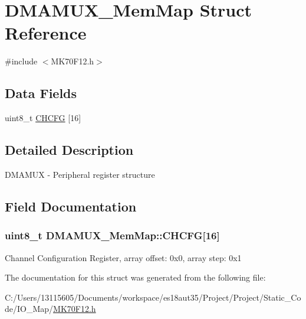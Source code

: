 \hypertarget{struct_d_m_a_m_u_x___mem_map}{}\section{D\+M\+A\+M\+U\+X\+\_\+\+Mem\+Map Struct Reference}
\label{struct_d_m_a_m_u_x___mem_map}


{\ttfamily \#include $<$M\+K70\+F12.\+h$>$}

\subsection*{Data Fields}
\begin{DoxyCompactItemize}
\item 
uint8\+\_\+t \hyperlink{struct_d_m_a_m_u_x___mem_map_a7ba04adde18230ace5b01e6b01725638}{C\+H\+C\+F\+G} \mbox{[}16\mbox{]}
\end{DoxyCompactItemize}


\subsection{Detailed Description}
D\+M\+A\+M\+U\+X -\/ Peripheral register structure 

\subsection{Field Documentation}
\hypertarget{struct_d_m_a_m_u_x___mem_map_a7ba04adde18230ace5b01e6b01725638}{}
\subsubsection[{C\+H\+C\+F\+G}]{\setlength{\rightskip}{0pt plus 5cm}uint8\+\_\+t D\+M\+A\+M\+U\+X\+\_\+\+Mem\+Map\+::\+C\+H\+C\+F\+G\mbox{[}16\mbox{]}}\label{struct_d_m_a_m_u_x___mem_map_a7ba04adde18230ace5b01e6b01725638}
Channel Configuration Register, array offset\+: 0x0, array step\+: 0x1 

The documentation for this struct was generated from the following file\+:\begin{DoxyCompactItemize}
\item 
C\+:/\+Users/13115605/\+Documents/workspace/es18aut35/\+Project/\+Project/\+Static\+\_\+\+Code/\+I\+O\+\_\+\+Map/\hyperlink{_m_k70_f12_8h}{M\+K70\+F12.\+h}\end{DoxyCompactItemize}
